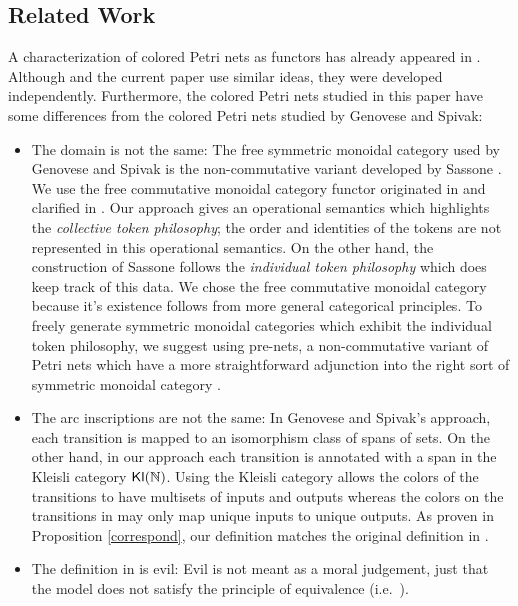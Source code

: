 \subsection{Related Work}
A characterization of colored Petri nets as functors has already appeared in \cite{Guarded}.  Although \cite{Guarded} and the current paper use similar ideas, they were developed independently. Furthermore, the colored Petri nets studied in this paper have some differences from the colored Petri nets studied by Genovese and Spivak:
\begin{itemize}
\item The domain is not the same: The free symmetric monoidal category used by Genovese and Spivak is the non-commutative variant developed by Sassone \cite{SassoneStrong}. We use the free commutative monoidal category functor originated in \cite{monoids} and clarified in \cite{GeneralizedPetriNets}. Our approach gives an operational semantics which highlights the \emph{collective token philosophy}; the order and identities of the tokens are not represented in this operational semantics. On the other hand, the construction of Sassone follows the \emph{individual token philosophy} which does keep track of this data. We chose the free commutative monoidal category because it's existence follows from more general categorical principles. To freely generate symmetric monoidal categories which exhibit the individual token philosophy, we suggest using pre-nets, a non-commutative variant of Petri nets which have a more straightforward adjunction into the right sort of symmetric monoidal category \cite{functorialsemantics}.
\item The arc inscriptions are not the same: In Genovese and Spivak's approach, each transition is mapped to an isomorphism class of spans of sets. On the other hand, in our approach each transition is annotated with a span in the Kleisli category $\mathsf{Kl}(\mathbb{N})$. Using the Kleisli category allows the colors of the transitions to have multisets of inputs and outputs whereas the colors on the transitions in \cite{Guarded} may only map unique inputs to unique outputs. As proven in Proposition \ref{correspond}, our definition matches the original definition in \cite{jensen}.
\item The definition in \cite{Guarded} is evil: 
Evil is not meant as a moral judgement, just that the model does not satisfy the principle of equivalence (i.e.\ \cite{evil}).

\end{itemize}
